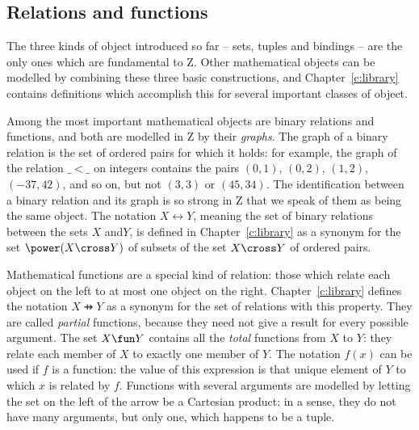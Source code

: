 \subsection{Relations and functions}

The three kinds of object introduced so far -- sets, tuples and
bindings -- are the only ones which are fundamental to Z.  Other
mathematical objects can be modelled by combining these three basic
constructions, and Chapter~\ref{c:library} contains definitions which
accomplish this for several important classes of object.

Among the most important mathematical objects are binary relations and
functions, and both are modelled in Z by their {\em graphs}.%
%
The graph of a binary relation is the set of ordered pairs for which
it holds: for example, the graph of the relation $\_ \lt \_$ on
integers contains the pairs $(0,1)$, $(0,2)$, $(1,2)$, $(\minus 37,
42)$, and so on, but not $(3,3)$ or $(45,34)$.  The identification
between a binary relation and its graph is so strong in Z that we
speak of them as being the same object. The notation $X \rel Y$,
meaning the set of binary relations between the sets $X$ and$Y$, is
defined in Chapter~\ref{c:library} as a synonym for the set
$\power(X \cross Y)$ of subsets of the set $X \cross Y$ of ordered
pairs.

Mathematical functions are a special kind of relation: those which
relate each object on the left to at most one object on the right.
Chapter~\ref{c:library} defines the notation $X \pfun Y$ as a
synonym for the set of relations with this property. They are called
{\em partial\/}%
functions, because they need not give a result for
every possible argument.  The set $X \fun Y$ contains all the {\em
total\/}%
functions from $X$ to $Y$: they relate each member of $X$
to exactly one member of $Y$.  The notation $f(x)$ can be used if
$f$ is a function: the value of this expression is that unique
element of $Y$ to which $x$ is related by $f$.  Functions with several
arguments are modelled by letting the set on the left of the arrow
be a Cartesian product: in a sense, they do not have many arguments,
but only one, which happens to be a tuple.

